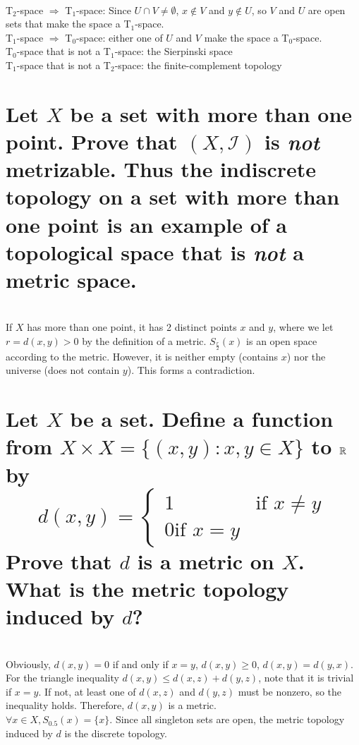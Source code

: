 \begin{solution}
 \\T$_2$-space $\Rightarrow$ T$_1$-space: Since $U \cap V \neq \emptyset$, $x \notin V$ and $y \notin U$, so $V$ and $U$ are open sets that make the space a T$_1$-space. \\
T$_1$-space $\Rightarrow$ T$_0$-space: either one of $U$ and $V$ make the space a T$_0$-space. \\
T$_0$-space that is not a T$_1$-space: the Sierpinski space \\
T$_1$-space that is not a T$_2$-space: the finite-complement topology \\
\end{solution}


\begin{parts}
 
 \part{Let $X$ be a set with more than one point. Prove that $(X, \mathcal{I})$ is \textit{not} metrizable. Thus the indiscrete topology on a set with more than one point is an example of a topological space that is \textit{not} a metric space.}
 
 
\begin{solution}
 \\If $X$ has more than one point, it has 2 distinct points $x$ and $y$, where we let $r = d(x,y) > 0$ by the definition of a metric. $S_{\frac{r}{2}}(x)$ is an open space according to the metric. However, it is neither empty (contains $x$) nor the universe (does not contain $y$). This forms a contradiction.
\end{solution}

\part{Let $X$ be a set. Define a function from $X \times X = \{(x,y):x,y\in X\}$ to $\mathbb{R}$ by $$d(x,y) = \begin{cases} 1 & \text{if } x \neq y \\ 0 \text{if } x = y \end{cases}$$ Prove that $d$ is a metric on $X$. What is the metric topology induced by $d$?}

\begin{solution}
 \\Obviously, $d(x,y) = 0$ if and only if $x=y$, $d(x,y) \geq 0$, $d(x,y) = d(y,x)$. For the triangle inequality $d(x,y) \leq d(x,z) + d(y,z)$, note that it is trivial if $x=y$. If not, at least one of $d(x,z)$ and $d(y,z)$ must be nonzero, so the inequality holds. Therefore, $d(x,y)$ is a metric. \\
 $\forall x \in X, S_{0.5}(x) = \{x\}$. Since all singleton sets are open, the metric topology induced by $d$ is the discrete topology.
\end{solution}
\end{parts}